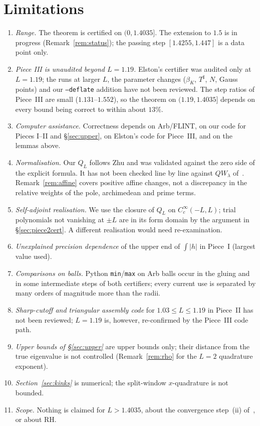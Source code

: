 \documentclass[11pt]{amsart}
\newcommand{\Lmax}{1.4035}                                %
\newcommand{\Tsh}{T^{\sharp}}
\theoremstyle{definition}
\theoremstyle{remark}
\numberwithin{equation}{section}
\begin{document}
\section{Limitations}\label{sec:limitations}
\begin{enumerate}
\item \emph{Range.} The theorem is certified on $(0,\Lmax]$. The extension to $1.5$ is in progress (Remark~\ref{rem:status}); the passing step $[1.4255,1.447]$ is a data point only.
\item \emph{Piece III is unaudited beyond $L=1.19$.} Elston's certifier was audited only at $L=1.19$; the runs at larger $L$, the parameter changes ($\beta_K$, $\Tsh$, $N$, Gauss points) and our \texttt{--deflate} addition have not been reviewed. The step ratios of Piece~III are small ($1.131$--$1.552$), so the theorem on $(1.19,\Lmax]$ depends on every bound being correct to within about $13\%$.
\item \emph{Computer assistance.} Correctness depends on Arb/FLINT, on our code for Pieces I--II and \S\ref{sec:upper}, on Elston's code for Piece~III, and on the lemmas above.
\item \emph{Normalisation.} Our $Q_L$ follows Zhu and was validated against the zero side of the explicit formula. It has not been checked line by line against $QW_\lambda$ of~\cite{CvS,CCM25}. Remark~\ref{rem:affine} covers positive affine changes, not a discrepancy in the relative weights of the pole, archimedean and prime terms.
\item \emph{Self-adjoint realisation.} We use the closure of $Q_L$ on $C_c^\infty(-L,L)$; trial polynomials not vanishing at $\pm L$ are in its form domain by the argument in \S\ref{sec:piece2cert}. A different realisation would need re-examination.
\item \emph{Unexplained precision dependence} of the upper end of $\int|h|$ in Piece~I (largest value used).
\item \emph{Comparisons on balls.} Python \texttt{min}/\texttt{max} on Arb balls occur in the gluing and in some intermediate steps of both certifiers; every current use is separated by many orders of magnitude more than the radii.
\item \emph{Sharp-cutoff and triangular assembly code} for $1.03\le L\le1.19$ in Piece~II has not been reviewed; $L=1.19$ is, however, re-confirmed by the Piece~III code path.
\item \emph{Upper bounds of \S\ref{sec:upper}} are upper bounds only; their distance from the true eigenvalue is not controlled (Remark~\ref{rem:rho} for the $L=2$ quadrature exponent).
\item \emph{Section~\ref{sec:kinks}} is numerical; the split-window $x$-quadrature is not bounded.
\item \emph{Scope.} Nothing is claimed for $L>\Lmax$, about the convergence step~(ii) of~\cite{CCM25}, or about RH.
\end{enumerate}
\end{document}
